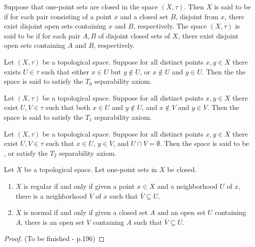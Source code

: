 \begin{definition}
    Suppose that one-point sets are closed in the space $(X,\tau)$. Then $X$ is said to be  if for each pair consisting of a point $x$ and a closed set $B$, disjoint from $x$, there exist disjoint open sets containing $x$ and $B$, respectively. The space $(X,\tau)$ is said to be  if for each pair $A,B$ of disjoint closed sets of $X$, there exist disjoint open sets containing $A$ and $B$, respectively.
\end{definition}


\begin{definition}
    Let $(X,\tau)$ be a topological space. Suppose for all distinct points $x,y \in X$ there exists $U \in \tau$ such that either $x \in U$ but $y \notin U$, or $x \notin U$ and $y \in U$. Then the the space is said to satisfy the $T_0$ separability axiom.
\end{definition}


\begin{definition}
    Let $(X,\tau)$ be a topological space. Suppose for all distinct points $x,y \in X$ there exist $U,V \in \tau$ such that both $x \in U$ and $y \notin U$, and $x \notin V$ and $y \in V$. Then the space is said to satisfy the $T_1$ separability axiom.
\end{definition}


\begin{definition}
    Let $(X,\tau)$ be a topological space. Suppose for all distinct points $x,y \in X$ there exist $U,V \in \tau$ such that $x \in U$, $y \in V$, and $U\cap V = \emptyset$. Then the space is said to be , or satisfy the $T_2$ separability axiom.
\end{definition}

\begin{lemma}
    Let $X$ be a topological space. Let one-point sets in $X$ be closed. \begin{enumerate}
        \item $X$ is regular if and only if given a point $x \in X$ and a neighborhood $U$ of $x$, there is a neighborhood $V$ of $x$ such that $\overline{V} \subseteq U$.
        \item $X$ is normal if and only if given a closed set $A$ and an open set $U$ containing $A$, there is an open set $V$ containing $A$ such that $\overline{V}\subseteq U$.
    \end{enumerate}
\end{lemma}
\begin{proof}
    (To be finished - p.196)
\end{proof}

